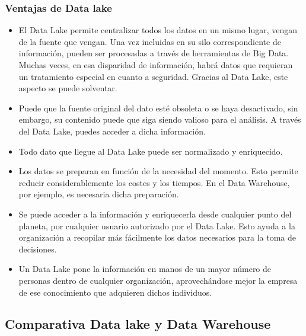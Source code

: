 \documentclass[twoside,twocolumn]{article}
\begin{document}
\subsubsection{Ventajas de Data lake}
\begin{itemize}
    \item El Data Lake permite centralizar todos los datos en un mismo lugar, vengan de la fuente que vengan. Una vez incluidas en su silo correspondiente de información, pueden ser procesadas a través de herramientas de Big Data. Muchas veces, en esa disparidad de información, habrá datos que requieran un tratamiento especial en cuanto a seguridad. Gracias al Data Lake, este aspecto se puede solventar.
    \item  Puede que la fuente original del dato esté obsoleta o se haya desactivado, sin embargo, su contenido puede que siga siendo valioso para el análisis. A través del Data Lake, puedes acceder a dicha información.
    \item  Todo dato que llegue al Data Lake puede ser normalizado y enriquecido.
    \item  Los datos se preparan en función de la necesidad del momento. Esto permite reducir considerablemente los costes y los tiempos. En el Data Warehouse, por ejemplo, es necesaria dicha preparación.
    \item  Se puede acceder a la información y enriquecerla desde cualquier punto del planeta, por cualquier usuario autorizado por el Data Lake. Esto ayuda a la organización a recopilar más fácilmente los datos necesarios para la toma de decisiones.
    \item  Un Data Lake pone la información en manos de un mayor número de personas dentro de cualquier organización, aprovechándose mejor la empresa de ese conocimiento que adquieren dichos individuos.
\end{itemize}
\subsection{Comparativa Data lake y Data Warehouse}
\end{document}
